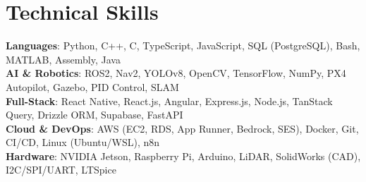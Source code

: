 \documentclass[letterpaper,11pt]{article}
\begin{document}
\section{Technical Skills}
 \begin{itemize}[leftmargin=0.15in, label={}]
    \small{\item{
\textbf{Languages}{: Python, C++, C, TypeScript, JavaScript, SQL (PostgreSQL), Bash, MATLAB, Assembly, Java} \\
\textbf{AI \& Robotics}{: ROS2, Nav2, YOLOv8, OpenCV, TensorFlow, NumPy, PX4 Autopilot, Gazebo, PID Control, SLAM} \\
\textbf{Full-Stack}{: React Native, React.js, Angular, Express.js, Node.js, TanStack Query, Drizzle ORM, Supabase, FastAPI} \\
\textbf{Cloud \& DevOps}{: AWS (EC2, RDS, App Runner, Bedrock, SES), Docker, Git, CI/CD, Linux (Ubuntu/WSL), n8n} \\
\textbf{Hardware}{: NVIDIA Jetson, Raspberry Pi, Arduino, LiDAR, SolidWorks (CAD), I2C/SPI/UART, LTSpice} \\
}}

 \end{itemize}


\end{document}
